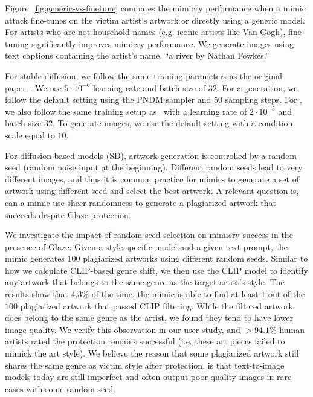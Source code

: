 Figure~\ref{fig:generic-vs-finetune} compares the mimicry performance when
a mimic attack fine-tunes on the victim artist's artwork or directly using a
generic model. For artists who are not household names (e.g. iconic artists like Van Gogh),
fine-tuning significantly improves mimicry performance. We generate 
images using text captions containing the artist's name, \eg ``a river by
Nathan Fowkes.''   

 For stable diffusion, we follow the
same training parameters as the original paper~\cite{rombach2022high}. We use
$5 \cdot 10^{-6}$ learning rate and batch size of $32$. For a generation, we
follow the default setting using the PNDM sampler and $50$ sampling
steps. For \dalleM, we also follow the same training setup as~\cite{d-mini} with
a learning rate of $2 \cdot 10^{-5}$ and batch size $32$. To generate images,
we use the default setting with a condition scale equal to $10$. 

 For diffusion-based models (\eg SD),
artwork generation is controlled by a random seed (random noise input at the
beginning). Different random seeds lead to very different images, and thus
it is common practice for mimics to generate a set of artwork using
different seed and select the best artwork. A relevant question is, can a
mimic use sheer randomness to generate a plagiarized artwork that succeeds
despite Glaze protection.

We investigate the impact of random seed selection on mimicry success in the
presence of Glaze. Given a style-specific model and a given text prompt, the
mimic generates $100$ plagiarized artworks using different random
seeds. Similar to how we calculate CLIP-based genre shift, we then use the
CLIP model to identify any artwork that belongs to the same genre as the
target artist's style. The results show that $4.3\%$ of the time, the mimic is able to find
at least $1$ out of the $100$ plagiarized artwork that passed CLIP
filtering. While the filtered artwork does belong to the same genre as the
artist, we found they tend to have lower image quality. We verify this
observation in our user study, and $> 94.1\%$ human artists rated the
protection remains successful (i.e. these art pieces failed to mimick the art
style). We believe the reason that
some plagiarized artwork still shares the same genre as victim style after
protection, is that text-to-image models today are still imperfect and often
output poor-quality images in rare cases with some random seed.

